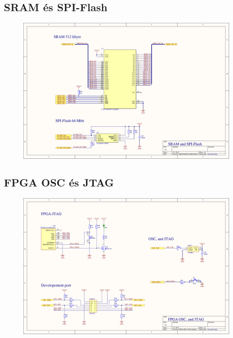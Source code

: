 \subsection{SRAM és SPI-Flash}
\begin{figure}[H]
	\centering
	\includegraphics[width=220mm, keepaspectratio, angle=90]{figures/SRAM-FLASH}
	\label{fig:SRAM-SPI-Flash}
\end{figure}
\subsection{FPGA OSC és JTAG}
\begin{figure}[H]
	\centering
	\includegraphics[width=220mm, keepaspectratio, angle=90]{figures/JTAG-OSC}
	\label{fig:OSC-JTAG}
\end{figure}
